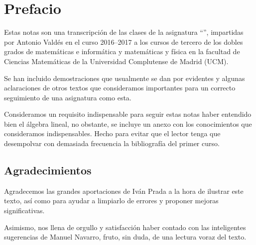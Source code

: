 \section*{Prefacio}
Estas notas son una transcripción de las clases de la asignatura ``'', impartidas por Antonio Valdés en el curso 2016--2017 a los cursos de tercero de los dobles grados de matemáticas e informática y matemáticas y física en la facultad de Ciencias Matemáticas de la Universidad Complutense de Madrid (UCM).

Se han incluido demostraciones que usualmente se dan por evidentes y algunas aclaraciones de otros textos que consideramos importantes para un correcto seguimiento de una asignatura como esta.

Consideramos un requisito indispensable para seguir estas notas haber entendido bien el álgebra lineal, no obstante, se incluye un anexo con los conocimientos que consideramos indispensables. Hecho para evitar que el lector tenga que desempolvar con demasiada frecuencia la bibliografía del primer curso.
\subsection*{Agradecimientos}
Agradecemos las grandes aportaciones de Iván Prada a la hora de ilustrar este texto, así como para ayudar a limpiarlo de errores y proponer mejoras significativas.

Asimismo, nos llena de orgullo y satisfacción haber contado con las inteligentes sugerencias de Manuel Navarro, fruto, sin duda, de una lectura voraz del texto. 